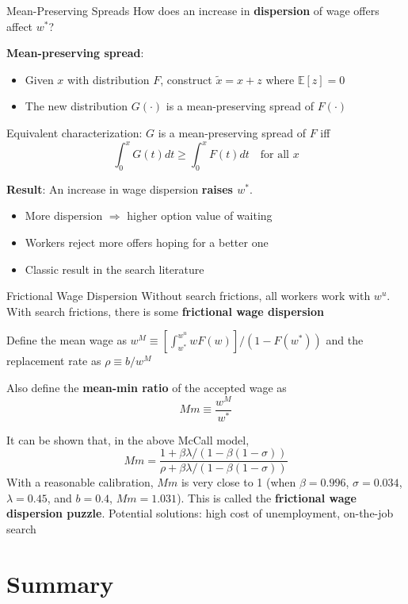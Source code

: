 \documentclass[blue]{beamer}
\newcommand{\E}{\mathbb{E}}
\begin{document}
	\begin{frame}{Mean-Preserving Spreads}
		How does an increase in \textbf{dispersion} of wage offers affect $w^*$?
		
		\bigskip
		\textbf{Mean-preserving spread}:
		\begin{itemize}
			\item Given $x$ with distribution $F$, construct $\tilde{x} = x + z$ where $\E[z] = 0$
			\item The new distribution $G(\cdot)$ is a mean-preserving spread of $F(\cdot)$
		\end{itemize}
		
		Equivalent characterization: $G$ is a mean-preserving spread of $F$ iff
		\[
		\int_0^x G(t) dt \geq \int_0^x F(t) dt \quad \text{for all } x
		\]
		
		\textbf{Result}: An increase in wage dispersion \textbf{raises $w^*$}.
		\begin{itemize}
			\item More dispersion $\Rightarrow$ higher option value of waiting
			\item Workers reject more offers hoping for a better one
			\item Classic result in the search literature
		\end{itemize}
	\end{frame}
	
		\begin{frame}{Frictional Wage Dispersion}
		Without search frictions, all workers work with $w^u$. With search frictions, there is some \textbf{frictional wage dispersion}
	
	Define the mean wage as $w^M\equiv [\int^{w^u}_{w^*}wF(w)]/(1-F(w^*))$ and the replacement rate as $
	\rho\equiv b/{w^M}$
	
	Also define the \textbf{mean-min ratio} of the accepted wage as
	$$
	Mm\equiv \frac{w^M}{w^*}
	$$
	
	It  can be shown that, in the above McCall model,
	$$
	Mm=\frac{1+\beta\lambda/(1-\beta(1-\sigma))}{\rho+\beta\lambda/(1-\beta(1-\sigma))}
	$$
	With a reasonable calibration, $Mm$ is very close to 1 (when $\beta=0.996$, $\sigma=0.034$, $\lambda=0.45$, and $b=0.4$, $Mm=1.031$). This is called the \textbf{frictional wage dispersion puzzle}. Potential solutions: high cost of unemployment, on-the-job search
	\end{frame}
	
	\section{Summary}
	
\end{document}
